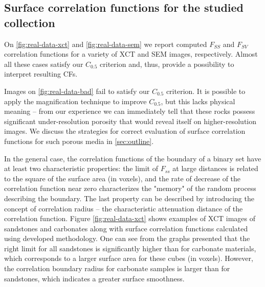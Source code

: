 \documentclass[reprint,amsmath,amssymb,aps,pre,showkeys,showpacs]{revtex4-1}
\begin{document}
\subsection{Surface correlation functions for the studied collection}
On \cref{fig:real-data-xct} and \cref{fig:real-data-sem} we report computed
$F_{SS}$ and $F_{SV}$ correlation functions for a variety of XCT and SEM images,
respectively. Almost all these cases satisfy our $C_{0.5}$ criterion and, thus,
provide a possibility to interpret resulting CFs.

Images on \cref{fig:real-data-bad} fail to satisfy our $C_{0.5}$ criterion. It is
possible to apply the magnification technique to improve $C_{0.5}$, but this
lacks physical meaning -- from our experience we can immediately tell that these
rocks possess significant under-resolution porosity that would reveal itself on
higher-resolution images. We discuss the strategies for correct evaluation of
surface correlation functions for such porous media in \cref{sec:outline}.

In the general case, the correlation functions of the boundary of a binary set
have at least two characteristic properties: the limit of $F_{ss}$ at large
distances is related to the square of the surface area (in voxels), and the rate
of decrease of the correlation function near zero characterizes the "memory" of
the random process describing the boundary. The last property can be described
by introducing the concept of correlation radius -- the characteristic
attenuation distance of the correlation function. Figure \ref{fig:real-data-xct}
shows examples of XCT images of sandstones and carbonates along with surface
correlation functions calculated using developed methodology.  One can see from
the graphs presented that the right limit for all sandstones is significantly
higher than for carbonate materials, which corresponds to a larger surface area
for these cubes (in voxels). However, the correlation boundary radius for
carbonate samples is larger than for sandstones, which indicates a greater
surface smoothness.
\end{document}
